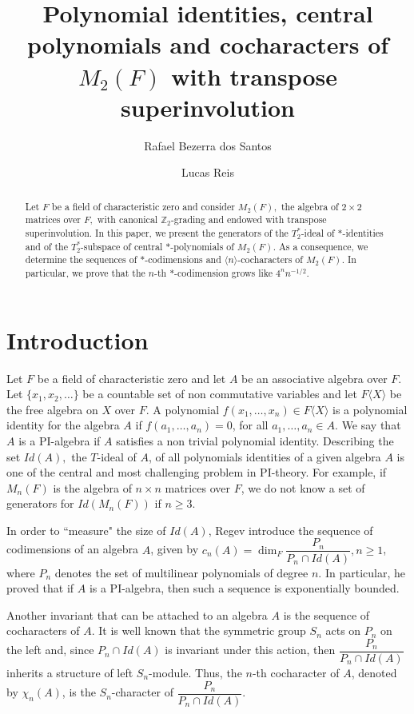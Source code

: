 \documentclass[11pt]{amsart}
\author{Rafael Bezerra dos Santos}
\author{Lucas Reis}
\theoremstyle{definition}
\theoremstyle{remark}
\begin{document}
\title[Identities, central polynomials and cocharacters of $(M_{1, 1}(F), trp)$]{Polynomial identities, central polynomials and cocharacters of $M_2(F)$ with transpose superinvolution} 

\begin{abstract} Let $F$ be a field of characteristic zero and consider $M_2(F),$ the algebra of $2\times 2$ matrices over $F,$ with canonical $\mathbb{Z}_2$-grading and endowed with transpose superinvolution. In this paper, we present the generators of the $T_2^*$-ideal of $*$-identities and of the $T_2^*$-subspace of central $*$-polynomials of $M_2(F).$ As a consequence, we determine the sequences of $*$-codimensions and $\langle n\rangle$-cocharacters of $M_2(F)$. In particular, we prove that the $n$-th $*$-codimension grows like $4^nn^{-1/2}$. 
\end{abstract}

\maketitle

\section{Introduction}

Let $F$ be a field of characteristic zero and let $A$ be an associative algebra over $F$. Let $\{x_1,x_2,\ldots\}$ be a countable set of non commutative variables and let $F\langle X\rangle$ be the free algebra on $X$ over $F$. A polynomial $f(x_1,\ldots, x_n)\in F\langle X\rangle$ is a polynomial identity for the algebra $A$ if $f(a_1,\ldots, a_n)=0$, for all $a_1,\ldots ,a_n\in A$. We say that $A$ is a PI-algebra if $A$ satisfies a non trivial polynomial identity. Describing the set $Id(A),$ the $T$-ideal of $A$, of all polynomials identities of a given algebra $A$ is one of the central and most challenging problem in PI-theory. For example, if $M_n(F)$ is the algebra of $n\times n$ matrices over $F$, we do not know a set of generators for $Id(M_n(F))$ if $n\geq 3.$

In order to ``measure" the size of $Id(A)$, Regev \cite{Regev} introduce the sequence of codimensions of an algebra $A$, given by $c_n(A)=\dim_F \dfrac{P_n}{P_n\cap Id(A)},n\geq 1$, where $P_n$ denotes the set of multilinear polynomials of degree $n$. In particular, he proved that if $A$ is a PI-algebra, then such a sequence is exponentially bounded.

Another invariant that can be attached to an algebra $A$ is the sequence of cocharacters of $A.$ It is well known that the symmetric group $S_n$ acts on $P_n$ on the left and, since $P_n\cap Id(A)$ is invariant under this action, then $\dfrac{P_n}{P_n\cap Id(A)}$ inherits a structure of left $S_n$-module. Thus, the $n$-th cocharacter of $A$, denoted by  $\chi_n(A)$, is the $S_n$-character of $\dfrac{P_n}{P_n\cap Id(A)}$.
\end{document}
